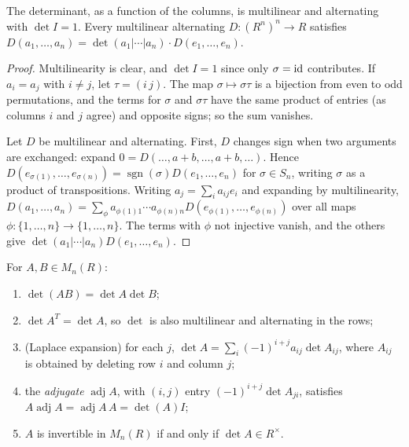 \begin{theorem}\label{linear-algebra:theorem-determinant}
The determinant, as a function of the columns, is multilinear and alternating with
$\det I = 1$. Every multilinear alternating $D \colon (R^n)^n \to R$ satisfies
$D(a_1, \ldots, a_n) = \det(a_1 | \cdots | a_n) \cdot D(e_1, \ldots, e_n)$.
\end{theorem}

\begin{proof}
Multilinearity is clear, and $\det I = 1$ since only $\sigma = \mathrm{id}$ contributes. If $a_i = a_j$ with
$i \neq j$, let $\tau = (i\,j)$. The map $\sigma \mapsto \sigma\tau$ is a bijection from even to odd permutations,
and the terms for $\sigma$ and $\sigma\tau$ have the same product of entries (as columns $i$ and $j$ agree)
and opposite signs; so the sum vanishes.

Let $D$ be multilinear and alternating. First, $D$ changes sign when two arguments are
exchanged: expand $0 = D(\ldots, a + b, \ldots, a + b, \ldots)$. Hence
$D(e_{\sigma(1)}, \ldots, e_{\sigma(n)}) = \operatorname{sgn}(\sigma) D(e_1, \ldots, e_n)$ for $\sigma \in S_n$, writing $\sigma$ as a
product of transpositions. Writing $a_j = \sum_i a_{ij}e_i$ and expanding by multilinearity,
$D(a_1, \ldots, a_n) = \sum_{\phi} a_{\phi(1)1} \cdots a_{\phi(n)n} D(e_{\phi(1)}, \ldots, e_{\phi(n)})$ over all maps
$\phi \colon \{1, \ldots, n\} \to \{1, \ldots, n\}$. The terms with $\phi$ not injective vanish, and the others give
$\det(a_1|\cdots|a_n) D(e_1, \ldots, e_n)$.
\end{proof}

\begin{proposition}\label{linear-algebra:proposition-determinant-properties}
For $A, B \in M_n(R)$:
\begin{enumerate}
\item $\det(AB) = \det A \det B$;
\item $\det A^T = \det A$, so $\det$ is also multilinear and alternating in the rows;
\item (Laplace expansion) for each $j$, $\det A = \sum_i (-1)^{i+j}a_{ij}\det A_{ij}$, where $A_{ij}$ is
obtained by deleting row $i$ and column $j$;
\item the \emph{adjugate} $\operatorname{adj}A$, with $(i,j)$ entry $(-1)^{i+j}\det A_{ji}$, satisfies
$A \operatorname{adj}A = \operatorname{adj}A \, A = \det(A) I$;
\item $A$ is invertible in $M_n(R)$ if and only if $\det A \in R^\times$.
\end{enumerate}
\end{proposition}


